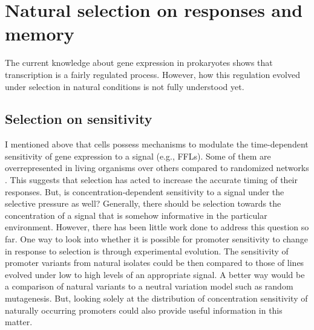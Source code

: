 \section{Natural selection on responses and memory}
The current knowledge about gene expression in prokaryotes shows that transcription is a fairly regulated process.
However, how this regulation evolved under selection in natural conditions is not fully understood yet.

\subsection{Selection on sensitivity}
I mentioned above that cells possess mechanisms to modulate the time-dependent sensitivity of gene expression to a signal (e.g., FFLs).
Some of them are overrepresented in living organisms over others compared to randomized networks \cite{shen2002network, mangan2003structure}.
This suggests that selection has acted to increase the accurate timing of their responses.
But, is concentration-dependent sensitivity to a signal under the selective pressure as well?
Generally, there should be selection towards the concentration of a signal that is somehow informative in the particular environment.
However, there has been little work done to address this question so far.
One way to look into whether it is possible for promoter sensitivity to change in response to selection is through experimental evolution.
The sensitivity of promoter variants from natural isolates could be then compared to those of lines evolved under low to high levels of an appropriate signal.
A better way would be a comparison of natural variants to a neutral variation model such as random mutagenesis.
But, looking solely at the distribution of concentration sensitivity of naturally occurring promoters could also provide useful information in this matter.

